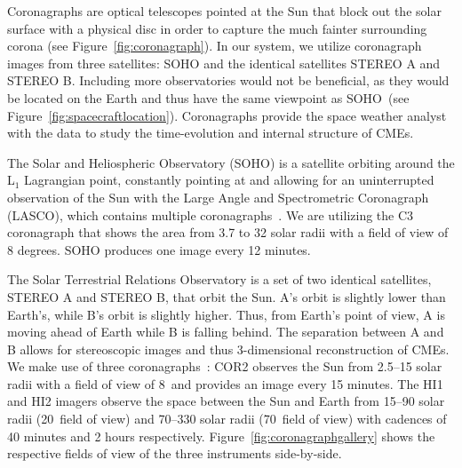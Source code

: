 \documentclass[journal]{vgtc}                %
\begin{document}
Coronagraphs are optical telescopes pointed at the Sun that block out the solar surface with a physical disc in order to capture the much fainter surrounding corona (see Figure~\ref{fig:coronagraph}). In our system, we utilize coronagraph images from three satellites: SOHO and the identical satellites STEREO A and STEREO B. Including more observatories would not be beneficial, as they would be located on the Earth and thus have the same viewpoint as SOHO~(see Figure~\ref{fig:spacecraftlocation}). Coronagraphs provide the space weather analyst with the data to study the time-evolution and internal structure of CMEs.

 The Solar and Heliospheric Observatory (SOHO) is a satellite orbiting around the L$_1$ Lagrangian point, constantly pointing at and allowing for an uninterrupted observation of the Sun with the Large Angle and Spectrometric Coronagraph (LASCO), which contains multiple coronagraphs~\cite{Brueckner:1995cb}. We are utilizing the C3 coronagraph that shows the area from 3.7 to 32 solar radii with a field of view of 8 degrees. SOHO produces one image every 12 minutes. 


 The Solar Terrestrial Relations Observatory is a set of two identical satellites, STEREO A and STEREO B, that orbit the Sun. A's orbit is slightly lower than Earth's, while B's orbit is slightly higher. Thus, from Earth's point of view, A is moving ahead of Earth while B is falling behind. The separation between A and B allows for stereoscopic images and thus 3-dimensional reconstruction of CMEs. We make use of three coronagraphs~\cite{Socker:2000ic}: COR2 observes the Sun from 2.5--15 solar radii with a field of view of 8\degree\ and provides an image every 15 minutes. The HI1 and HI2 imagers observe the space between the Sun and Earth from 15--90 solar radii (20\degree\ field of view) and 70--330 solar radii (70\degree\ field of view) with cadences of 40 minutes and 2 hours respectively. Figure~\ref{fig:coronagraphgallery} shows the respective fields of view of the three instruments side-by-side.
\end{document}
